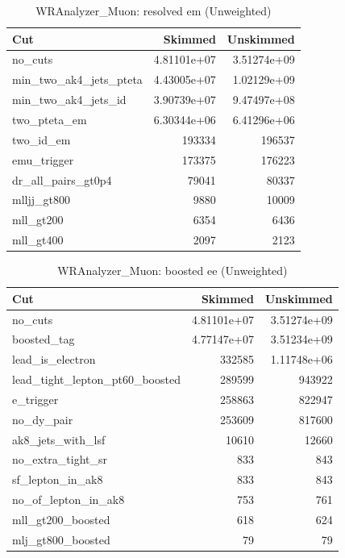 \documentclass{article}
\begin{document}
\begin{table}[htbp]
\centering
\caption{WRAnalyzer\_Muon: resolved em (Unweighted)}
\begin{tabular}{lrr}
\hline
Cut & Skimmed & Unskimmed \\
\hline
no\_cuts & 4.81101e+07 & 3.51274e+09 \\
min\_two\_ak4\_jets\_pteta & 4.43005e+07 & 1.02129e+09 \\
min\_two\_ak4\_jets\_id & 3.90739e+07 & 9.47497e+08 \\
two\_pteta\_em & 6.30344e+06 & 6.41296e+06 \\
two\_id\_em & 193334 & 196537 \\
emu\_trigger & 173375 & 176223 \\
dr\_all\_pairs\_gt0p4 & 79041 & 80337 \\
mlljj\_gt800 & 9880 & 10009 \\
mll\_gt200 & 6354 & 6436 \\
mll\_gt400 & 2097 & 2123 \\
\hline
\end{tabular}
\end{table}

\begin{table}[htbp]
\centering
\caption{WRAnalyzer\_Muon: boosted ee (Unweighted)}
\begin{tabular}{lrr}
\hline
Cut & Skimmed & Unskimmed \\
\hline
no\_cuts & 4.81101e+07 & 3.51274e+09 \\
boosted\_tag & 4.77147e+07 & 3.51234e+09 \\
lead\_is\_electron & 332585 & 1.11748e+06 \\
lead\_tight\_lepton\_pt60\_boosted & 289599 & 943922 \\
e\_trigger & 258863 & 822947 \\
no\_dy\_pair & 253609 & 817600 \\
ak8\_jets\_with\_lsf & 10610 & 12660 \\
no\_extra\_tight\_sr & 833 & 843 \\
sf\_lepton\_in\_ak8 & 833 & 843 \\
no\_of\_lepton\_in\_ak8 & 753 & 761 \\
mll\_gt200\_boosted & 618 & 624 \\
mlj\_gt800\_boosted & 79 & 79 \\
\hline
\end{tabular}
\end{table}
\end{document}
